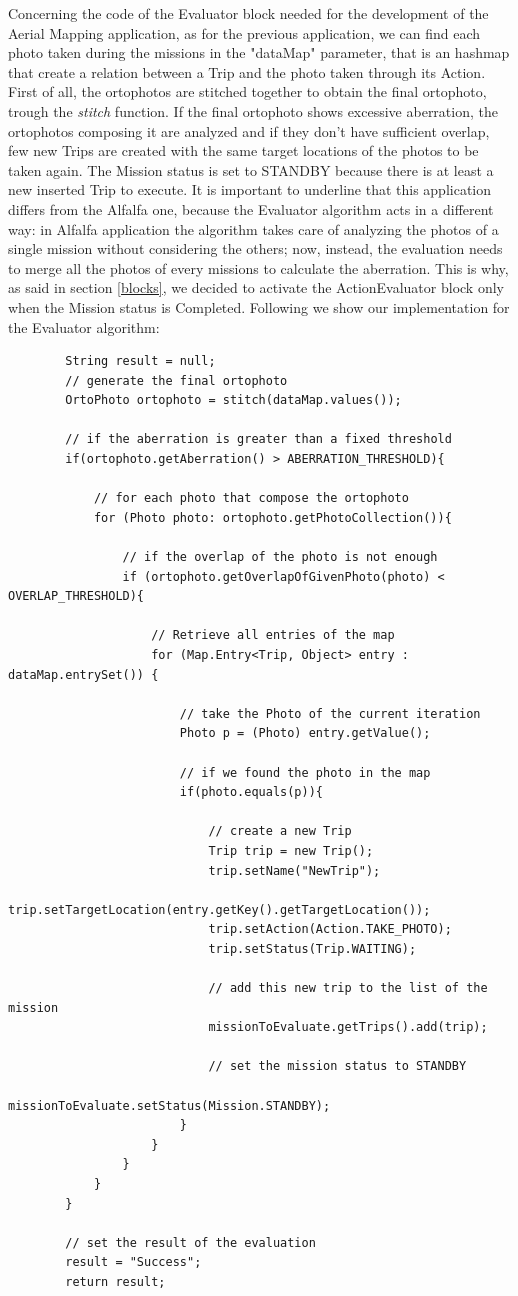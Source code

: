 Concerning the code of the Evaluator block needed for the development of the Aerial Mapping\cite{putti} application, as for the previous application, we can find each photo taken during the missions in the "dataMap" parameter, that is an hashmap that create a relation between a Trip and the photo taken through its Action.
First of all, the ortophotos are stitched together to obtain the final ortophoto, trough the \textit{stitch} function.
If the final ortophoto shows excessive aberration, the ortophotos composing it are analyzed and if they don't have sufficient overlap, few new Trips are created with the same target locations of the photos to be taken again. 
The Mission status is set to STANDBY because there is at least a new inserted Trip to execute.
It is important to underline that this application differs from the Alfalfa\cite{alfalfa} one, because the Evaluator algorithm acts in a different way: in Alfalfa\cite{alfalfa} application the algorithm takes care of analyzing the photos of a single mission without considering the others; now, instead, the evaluation needs to merge all the photos of every missions to calculate the aberration. This is why, as said in section \ref{blocks}, we decided to activate the ActionEvaluator block only when the Mission status is Completed. 
Following we show our implementation for the Evaluator algorithm:
\\
\begin{lstlisting}
		String result = null;
		// generate the final ortophoto
		OrtoPhoto ortophoto = stitch(dataMap.values());
		
		// if the aberration is greater than a fixed threshold
		if(ortophoto.getAberration() > ABERRATION_THRESHOLD){
			
			// for each photo that compose the ortophoto
			for (Photo photo: ortophoto.getPhotoCollection()){
				
				// if the overlap of the photo is not enough
				if (ortophoto.getOverlapOfGivenPhoto(photo) < OVERLAP_THRESHOLD){
					
					// Retrieve all entries of the map
					for (Map.Entry<Trip, Object> entry : dataMap.entrySet()) {
						
						// take the Photo of the current iteration
						Photo p = (Photo) entry.getValue();
						
						// if we found the photo in the map
						if(photo.equals(p)){
							
							// create a new Trip
							Trip trip = new Trip();
							trip.setName("NewTrip");
							trip.setTargetLocation(entry.getKey().getTargetLocation());
							trip.setAction(Action.TAKE_PHOTO);
							trip.setStatus(Trip.WAITING);

							// add this new trip to the list of the mission
							missionToEvaluate.getTrips().add(trip);
							
							// set the mission status to STANDBY
							missionToEvaluate.setStatus(Mission.STANDBY);
						}
					}		
				}
			}
		}
        
        // set the result of the evaluation
		result = "Success";
		return result;
\end{lstlisting}


